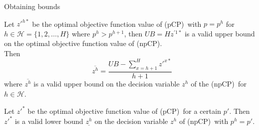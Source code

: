 \documentclass[utf8,aspectratio=169,ngerman,english]{beamer}
\renewcommand{\emph}[1]{\textcolor{jkuGreen}{#1}}
\newcommand{\nPCY}{\hyperref[eq:nPCY]{\texttt{(nPC2)}}}
\newcommand{\nPCE}{\hyperref[eq:nPCE]{\texttt{(nPC3)}}}
\newcommand{\npCP}{\emph{(npCP)}}
\newcommand{\pCP}{\emph{(pCP)}}
\begin{document}
\begin{frame}[allowframebreaks]{Obtaining bounds}
    \begin{lemma}\label{lemma:upperbounds}
        Let $z'^{h*}$ be the optimal objective function value of \pCP\ with $p = p^h$ for $h \in \mathcal H = \{1, 2, \dots, H\}$ where $p^h > p^{h+1}$, then 
        $UB = H z^{'1*}$ is a valid upper bound on the optimal objective function value of \npCP. \\
        Then
        \begin{equation*}
            \overline{z^h} = \frac{UB - \sum_{x = h+1}^{H}z'^{x*}}{h+1}
        \end{equation*}
        where $\overline{z^h}$ is a valid upper bound on the decision variable $z^h$ of the \npCP\ for $h \in \mathcal H$.
    \end{lemma}
    \begin{lemma}\label{lemma:lowerbounds}
        Let $z'^{*}$ be the optimal objective function value of \pCP\ for a certain $p'$. Then $z'^{*}$ is a valid lower bound $\underline{z^h}$ on the decision variable $z^h$ of \npCP\ with $p^h = p'$. 
    \end{lemma}
\end{frame}
\end{document}
